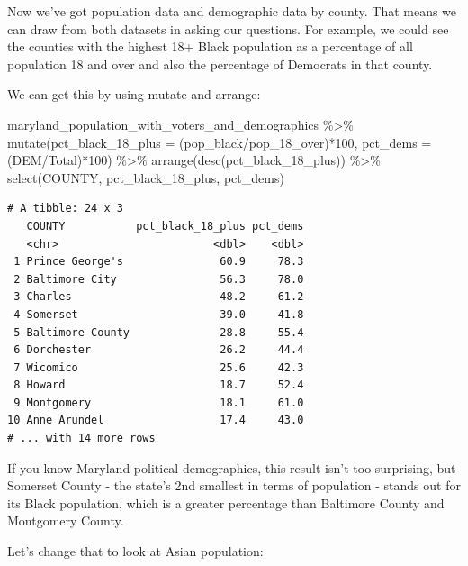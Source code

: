 \documentclass[
  letterpaper,
  DIV=11,
  numbers=noendperiod]{scrreprt}
\newenvironment{Shaded}{\begin{snugshade}}{\end{snugshade}}
\newcommand{\AttributeTok}[1]{\textcolor[rgb]{0.40,0.45,0.13}{#1}}
\newcommand{\DecValTok}[1]{\textcolor[rgb]{0.68,0.00,0.00}{#1}}
\newcommand{\FunctionTok}[1]{\textcolor[rgb]{0.28,0.35,0.67}{#1}}
\newcommand{\NormalTok}[1]{\textcolor[rgb]{0.00,0.23,0.31}{#1}}
\newcommand{\SpecialCharTok}[1]{\textcolor[rgb]{0.37,0.37,0.37}{#1}}
\begin{document}
Now we've got population data and demographic data by county. That means
we can draw from both datasets in asking our questions. For example, we
could see the counties with the highest 18+ Black population as a
percentage of all population 18 and over and also the percentage of
Democrats in that county.

We can get this by using mutate and arrange:

\begin{Shaded}
\begin{Highlighting}[]
\NormalTok{maryland\_population\_with\_voters\_and\_demographics }\SpecialCharTok{\%\textgreater{}\%}
  \FunctionTok{mutate}\NormalTok{(}\AttributeTok{pct\_black\_18\_plus =}\NormalTok{ (pop\_black}\SpecialCharTok{/}\NormalTok{pop\_18\_over)}\SpecialCharTok{*}\DecValTok{100}\NormalTok{, }\AttributeTok{pct\_dems =}\NormalTok{ (DEM}\SpecialCharTok{/}\NormalTok{Total)}\SpecialCharTok{*}\DecValTok{100}\NormalTok{) }\SpecialCharTok{\%\textgreater{}\%}
  \FunctionTok{arrange}\NormalTok{(}\FunctionTok{desc}\NormalTok{(pct\_black\_18\_plus)) }\SpecialCharTok{\%\textgreater{}\%}
  \FunctionTok{select}\NormalTok{(COUNTY, pct\_black\_18\_plus, pct\_dems)}
\end{Highlighting}
\end{Shaded}

\begin{verbatim}
# A tibble: 24 x 3
   COUNTY           pct_black_18_plus pct_dems
   <chr>                        <dbl>    <dbl>
 1 Prince George's               60.9     78.3
 2 Baltimore City                56.3     78.0
 3 Charles                       48.2     61.2
 4 Somerset                      39.0     41.8
 5 Baltimore County              28.8     55.4
 6 Dorchester                    26.2     44.4
 7 Wicomico                      25.6     42.3
 8 Howard                        18.7     52.4
 9 Montgomery                    18.1     61.0
10 Anne Arundel                  17.4     43.0
# ... with 14 more rows
\end{verbatim}

If you know Maryland political demographics, this result isn't too
surprising, but Somerset County - the state's 2nd smallest in terms of
population - stands out for its Black population, which is a greater
percentage than Baltimore County and Montgomery County.

Let's change that to look at Asian population:
\end{document}
